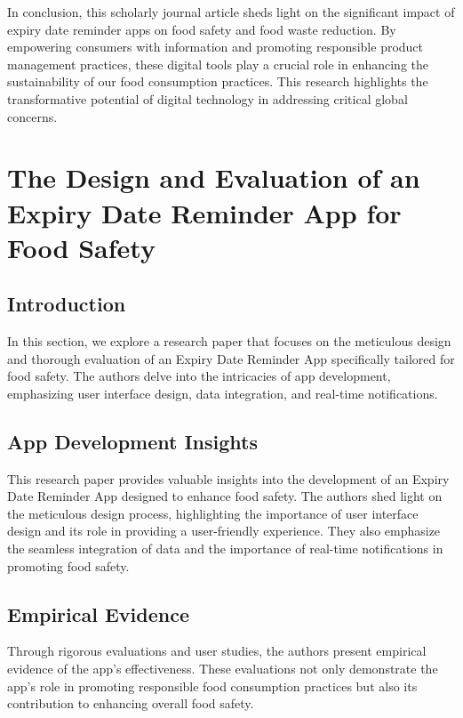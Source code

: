 In conclusion, this scholarly journal article sheds light on the significant impact of expiry date reminder apps on food safety and food waste reduction. By empowering consumers with information and promoting responsible product management practices, these digital tools play a crucial role in enhancing the sustainability of our food consumption practices. This research highlights the transformative potential of digital technology in addressing critical global concerns.



\section{The Design and Evaluation of an Expiry Date Reminder App for Food Safety}

\subsection{Introduction}

In this section, we explore a research paper that focuses on the meticulous design and thorough evaluation of an Expiry Date Reminder App specifically tailored for food safety. The authors delve into the intricacies of app development, emphasizing user interface design, data integration, and real-time notifications.

\subsection{App Development Insights}

This research paper provides valuable insights into the development of an Expiry Date Reminder App designed to enhance food safety. The authors shed light on the meticulous design process, highlighting the importance of user interface design and its role in providing a user-friendly experience. They also emphasize the seamless integration of data and the importance of real-time notifications in promoting food safety.

\subsection{Empirical Evidence}

Through rigorous evaluations and user studies, the authors present empirical evidence of the app's effectiveness. These evaluations not only demonstrate the app's role in promoting responsible food consumption practices but also its contribution to enhancing overall food safety.

